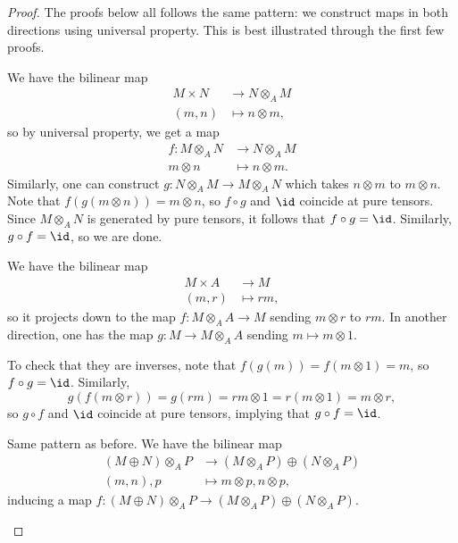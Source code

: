 \begin{proof}
    The proofs below all follows the same pattern:
    we construct maps in both directions using 
    universal property. This is best illustrated through 
    the first few proofs.
    \begin{alphenum}
    \item We have the bilinear map
    \begin{align*}
	M\times N &\to N\otimes_A M \\
	(m,n) &\mapsto n\otimes m,
    \end{align*}
    so by universal property, we get a map
    \begin{align*}
	f : M\otimes_A N &\to N\otimes_A M \\
	m\otimes n &\mapsto n\otimes m.
    \end{align*}
    Similarly, one can construct
    $g : N\otimes_A M \to M\otimes_A N$
    which takes $n\otimes m$ to $m\otimes n$.
    Note that $f(g(m\otimes n)) = m\otimes n$,
    so $f\circ g$ and $\id$ coincide at pure tensors.
    Since $M\otimes_A N$ is generated by pure tensors,
    it follows that $f\circ g = \id$. Similarly, $g\circ f = \id$, so we are done.
    \item 
    We have the bilinear map
    \begin{align*}
	M\times A &\to M \\
	(m,r) &\mapsto rm,
    \end{align*}
    so it projects down to the map $f : M\otimes_A A\to M$
    sending $m\otimes r$ to $rm$.
    In another direction, one has the map $g : M\to M\otimes_A A$ sending $m\mapsto m\otimes 1$.

    To check that they are inverses, note that 
    $f(g(m)) = f(m\otimes 1) = m$, so $f\circ g=\id$.
    Similarly, 
    $$g(f(m\otimes r)) = g(rm) = rm\otimes 1 
    = r(m\otimes 1) = m\otimes r,$$
    so $g\circ f$ and $\id$ coincide at pure tensors,
    implying that $g\circ f = \id$.
    \item 
    Same pattern as before.
    We have the bilinear map
    \begin{align*}
	(M\oplus N)\otimes_A P &\to (M\otimes_A P)\oplus
	(N\otimes_A P) \\
	(m,n),p &\mapsto m\otimes p, n\otimes p,
    \end{align*}
    inducing a map $f : (M\oplus N)\otimes_A P
    \to (M\otimes_A P)\oplus (N\otimes_A P)$.


\end{alphenum}
\end{proof}
